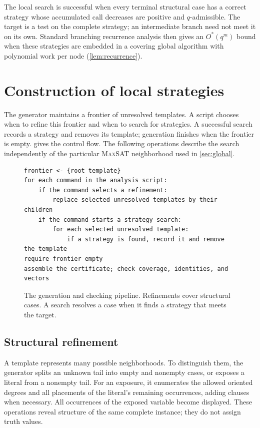 \documentclass[10pt,twoside]{article}
\newcommand{\MaxSAT}{\textnormal{\textsc{MaxSAT}}}
\newcommand{\OhStar}{O^*}
\theoremstyle{definition}
\theoremstyle{remark}
\begin{document}
The local search is successful when every terminal structural case has a
correct strategy whose accumulated call decreases are positive and
$q$-admissible. The target is a test on the complete strategy; an intermediate
branch need not meet it on its own. Standard branching recurrence analysis
then gives an $\OhStar(q^m)$ bound when these strategies are embedded in a
covering global algorithm with polynomial work per node
(\cref{lem:recurrence}).

\section{Construction of local strategies}
\label{sec:automation}
\label{sec:overview}

The generator maintains a frontier of unresolved templates. A script chooses
when to refine this frontier and when to search for strategies. A successful
search records a strategy and removes its template; generation finishes when
the frontier is empty.  gives the control flow. The
following operations describe the search independently of the particular
\MaxSAT{} neighborhood used in \cref{sec:global}.

\begin{figure}[!htbp]
\centering
\begin{minipage}{\linewidth}
\begin{lstlisting}
frontier <- {root template}
for each command in the analysis script:
    if the command selects a refinement:
        replace selected unresolved templates by their children
    if the command starts a strategy search:
        for each selected unresolved template:
            if a strategy is found, record it and remove the template
require frontier empty
assemble the certificate; check coverage, identities, and vectors
\end{lstlisting}
\end{minipage}
\caption{The generation and checking pipeline. Refinements cover structural
cases. A search resolves a case when it finds a strategy that meets the
target.}
\label{fig:pipeline}
\end{figure}

\subsection{Structural refinement}

A template represents many possible neighborhoods. To distinguish them, the
generator splits an unknown tail into empty and nonempty cases, or exposes a
literal from a nonempty tail. For an exposure, it enumerates the allowed
oriented degrees and all placements of the literal's remaining occurrences,
adding clauses when necessary. All occurrences of the exposed variable become
displayed. These operations reveal structure of the same complete instance;
they do not assign truth values.
\end{document}

